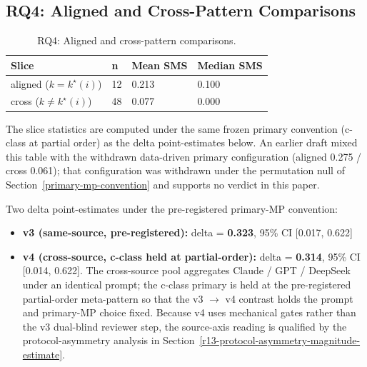 \documentclass[manuscript,screen,review]{acmart}
\begin{document}
\subsection{RQ4: Aligned and Cross-Pattern Comparisons}\label{rq2-aligned-vs-cross-cliffs-delta}

{%
\begin{longtable}[]{@{}llll@{}}
\caption{RQ4: Aligned and cross-pattern comparisons.}\label{tab:p2-09}\\
\toprule\noalign{}
Slice & n & Mean SMS & Median SMS \\
\midrule\noalign{}
\endhead
\bottomrule\noalign{}
\endlastfoot
aligned ($k = k^\star(i)$) & 12 & 0.213 & 0.100 \\
cross ($k \neq k^\star(i)$) & 48 & 0.077 & 0.000 \\
\end{longtable}
}

The slice statistics are computed under the same frozen primary
convention (c-class at partial order) as the delta point-estimates
below. An earlier draft mixed this table with the withdrawn data-driven
primary configuration (aligned 0.275 / cross 0.061); that configuration
was withdrawn under the permutation null of
Section~\ref{primary-mp-convention} and supports no verdict in this
paper.

Two delta point-estimates under the pre-registered primary-MP
convention:

\begin{itemize}

\item
  \textbf{v3 (same-source, pre-registered):} delta = \textbf{0.323},
  95\% CI {[}0.017, 0.622{]}
\item
  \textbf{v4 (cross-source, c-class held at partial-order):} delta =
  \textbf{0.314}, 95\% CI {[}0.014, 0.622{]}. The cross-source pool
  aggregates Claude / GPT / DeepSeek under an identical prompt; the
  c-class primary is held at the pre-registered partial-order
  meta-pattern so that the v3 $\to$ v4
  contrast holds the prompt and primary-MP choice fixed. Because v4 uses
  mechanical gates rather than the v3 dual-blind reviewer step, the
  source-axis reading is qualified by the protocol-asymmetry analysis in
  Section~\ref{r13-protocol-asymmetry-magnitude-estimate}.
\end{itemize}
\end{document}
